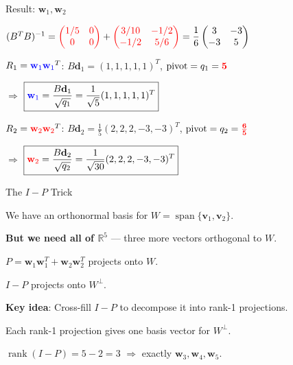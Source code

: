 \documentclass[10pt]{beamer}
\theoremstyle{definition}
\newcommand{\x}[1]{\alert{\textbf{#1}}}
\newcommand{\pvt}[1]{{\color{red}\mathbf{#1}}}       %
\newcommand{\rd}[1]{{\color{red}#1}}                  %
\newcommand{\bl}[1]{{\color{blue}#1}}                 %
\begin{document}
\begin{frame}{Result: $\mathbf{w}_1, \mathbf{w}_2$}

$(B^TB)^{-1} = \rd{\begin{pmatrix} 1/5 & 0 \\ 0 & 0 \end{pmatrix}} + \rd{\begin{pmatrix} 3/10 & -1/2 \\ -1/2 & 5/6 \end{pmatrix}} = \dfrac{1}{6}\begin{pmatrix} 3 & -3 \\ -3 & 5 \end{pmatrix}$

\vspace{0.5em}

$R_1 = \bl{\mathbf{w}_1}\bl{\mathbf{w}_1}^T$: \; $B\mathbf{d}_1 = (1,1,1,1,1)^T$, \; $\text{pivot} = q_1 = \pvt{5}$

$\Longrightarrow$ \quad $\boxed{\bl{\mathbf{w}_1} = \dfrac{B\mathbf{d}_1}{\sqrt{q_1}} = \dfrac{1}{\sqrt{5}}(1,1,1,1,1)^T}$

\vspace{0.3em}

$R_2 = \rd{\mathbf{w}_2}\rd{\mathbf{w}_2}^T$: \; $B\mathbf{d}_2 = \tfrac{1}{5}(2, 2, 2, {-}3, {-}3)^T$, \; $\text{pivot} = q_2 = \pvt{\tfrac{6}{5}}$

$\Longrightarrow$ \quad $\boxed{\rd{\mathbf{w}_2} = \dfrac{B\mathbf{d}_2}{\sqrt{q_2}} = \dfrac{1}{\sqrt{30}}(2, 2, 2, {-}3, {-}3)^T}$

\end{frame}


\begin{frame}{The $I - P$ Trick}

We have an orthonormal basis for $W = \operatorname{span}\{\mathbf{v}_1, \mathbf{v}_2\}$.

\x{But we need all of $\mathbb{R}^5$} --- three more vectors orthogonal to $W$.

\vspace{0.5em}

$P = \mathbf{w}_1\mathbf{w}_1^T + \mathbf{w}_2\mathbf{w}_2^T$ projects onto $W$.

$I - P$ projects onto $W^\perp$.

\vspace{0.5em}

\x{Key idea}: Cross-fill $I - P$ to decompose it into rank-1 projections.

Each rank-1 projection gives one basis vector for $W^\perp$.

$\operatorname{rank}(I - P) = 5 - 2 = 3$ $\Longrightarrow$ exactly $\mathbf{w}_3, \mathbf{w}_4, \mathbf{w}_5$.

\end{frame}
\end{document}
